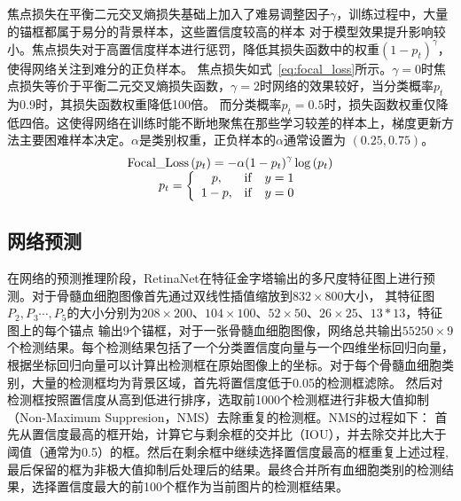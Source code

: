 焦点损失在平衡二元交叉熵损失基础上加入了难易调整因子$\gamma$，训练过程中，大量的锚框都属于易分的背景样本，这些置信度较高的样本
对于模型效果提升影响较小。焦点损失对于高置信度样本进行惩罚，降低其损失函数中的权重$(1-p_t)^{\gamma}$，使得网络关注到难分的正负样本。
焦点损失如式~\ref{eq:focal_loss}所示。$\gamma=0$时焦点损失等价于平衡二元交叉熵损失函数，$\gamma=2$时网络的效果较好，当分类概率$p_t$为0.9时，其损失函数权重降低100倍。
而分类概率$p_t = 0.5$时，损失函数权重仅降低四倍。这使得网络在训练时能不断地聚焦在那些学习较差的样本上，梯度更新方法主要困难样本决定。$\alpha$是类别权重，正负样本的$\alpha$通常设置为
$(0.25, 0.75)$。
\begin{equation}               
  \begin{array}{*{20}{c}} {{\rm{Focal\_Loss}}\left( {{p_t}} \right) =  - \alpha {{\left( {1 - {p_t}} \right)}^\gamma }\log \left( {{p_t}} \right)}\\ 
    {{p_t} = \left\{ {\begin{array}{*{20}{c}} {p,}&{{\rm{ if }}}&{y = 1}\\ {1 - p,}&{{\rm{ if }}}&{y = 0} \end{array}} \right.} \end{array}    
  \label{eq:focal_loss}     
\end{equation} 

\subsection{网络预测}

在网络的预测推理阶段，RetinaNet在特征金字塔输出的多尺度特征图上进行预测。对于骨髓血细胞图像首先通过双线性插值缩放到$832 \times 800$大小，
其特征图$P_2, P_3 \cdots, P_5$的大小分别为$208 \times 200$、$104 \times 100$、$52 \times 50$、$ 26 \times 25$、$13 * 13$，特征图上的每个锚点
输出9个锚框，对于一张骨髓血细胞图像，网络总共输出$55250 \times 9$个检测结果。每个检测结果包括了一个分类置信度向量与一个四维坐标回归向量，
根据坐标回归向量可以计算出检测框在原始图像上的坐标。对于每个骨髓血细胞类别，大量的检测框均为背景区域，首先将置信度低于0.05的检测框滤除。
然后对检测框按照置信度从高到低进行排序，选取前1000个检测框进行非极大值抑制（Non-Maximum Suppresion，NMS）\cite{neubeck2006efficient}去除重复的检测框。NMS的过程如下：
首先从置信度最高的框开始，计算它与剩余框的交并比（IOU），并去除交并比大于阈值（通常为0.5）的框。然后在剩余框中继续选择置信度最高的框重复上述过程,
最后保留的框为非极大值抑制后处理后的结果。最终合并所有血细胞类别的检测结果，选择置信度最大的前100个框作为当前图片的检测框结果。


